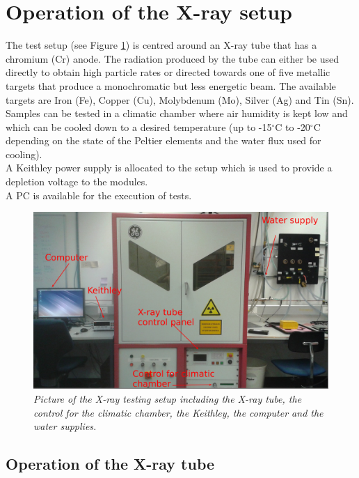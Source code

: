 \documentclass[a4paper,12pt,twoside]{article}
\begin{document}
\section{Operation of the X-ray setup}  \label{Xraysetup}
The test setup (see Figure \ref{Setup}) is centred around an X-ray tube that has a chromium (Cr) anode. The radiation produced by the tube can either be used directly to obtain high particle rates or directed towards one of five metallic targets that produce a monochromatic but less energetic beam. The available targets are Iron (Fe), Copper (Cu), Molybdenum (Mo), Silver (Ag) and Tin (Sn). \\
Samples can be tested in a climatic chamber where air humidity is kept low and which can be cooled down to a desired temperature (up to -15$^\circ$C to -20$^\circ$C depending on the state of the Peltier elements and the water flux used for cooling). \\
A Keithley power supply is allocated to the setup which is used to provide a depletion voltage to the modules. \\
A PC is available for the execution of tests.

\begin{figure} [h!] \centering
\includegraphics[width=\textwidth, angle=0] {./Figures/Setup.jpg}
\caption{\em  \label{Setup}
Picture of the X-ray testing setup including the X-ray tube, the control for the climatic chamber, the Keithley, the computer and the water supplies.}
\end{figure}


\subsection{Operation of the X-ray tube} \label{Operation}
\end{document}
